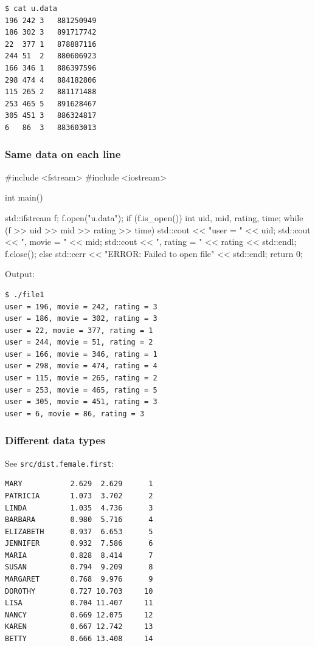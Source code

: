 \documentclass[12pt,letterpaper,twoside]{article}
\begin{document}
\begin{verbatim}
$ cat u.data
196 242 3   881250949
186 302 3   891717742
22  377 1   878887116
244 51  2   880606923
166 346 1   886397596
298 474 4   884182806
115 265 2   881171488
253 465 5   891628467
305 451 3   886324817
6   86  3   883603013
\end{verbatim}

\subsubsection{Same data on each line}
\begin{cpp}
#include <fstream>
#include <iostream>

int main() {

  std::ifstream f;
  f.open("u.data");
  if (f.is_open()) {
    int uid, mid, rating, time;
    while (f >> uid >> mid >> rating >> time) {
      std::cout << "user = " << uid;
      std::cout << ", movie = " << mid;
      std::cout << ", rating = " << rating << std::endl;
    }
    f.close();
  }
  else {
    std::cerr << "ERROR: Failed to open file" << std::endl;
  }
  return 0;
}
\end{cpp}

Output:

\begin{verbatim}
$ ./file1
user = 196, movie = 242, rating = 3
user = 186, movie = 302, rating = 3
user = 22, movie = 377, rating = 1
user = 244, movie = 51, rating = 2
user = 166, movie = 346, rating = 1
user = 298, movie = 474, rating = 4
user = 115, movie = 265, rating = 2
user = 253, movie = 465, rating = 5
user = 305, movie = 451, rating = 3
user = 6, movie = 86, rating = 3
\end{verbatim}

\subsubsection{Different data types}
See \texttt{src/dist.female.first}:

\begin{verbatim}
MARY           2.629  2.629      1
PATRICIA       1.073  3.702      2
LINDA          1.035  4.736      3
BARBARA        0.980  5.716      4
ELIZABETH      0.937  6.653      5
JENNIFER       0.932  7.586      6
MARIA          0.828  8.414      7
SUSAN          0.794  9.209      8
MARGARET       0.768  9.976      9
DOROTHY        0.727 10.703     10
LISA           0.704 11.407     11
NANCY          0.669 12.075     12
KAREN          0.667 12.742     13
BETTY          0.666 13.408     14
\end{verbatim}
\end{document}
